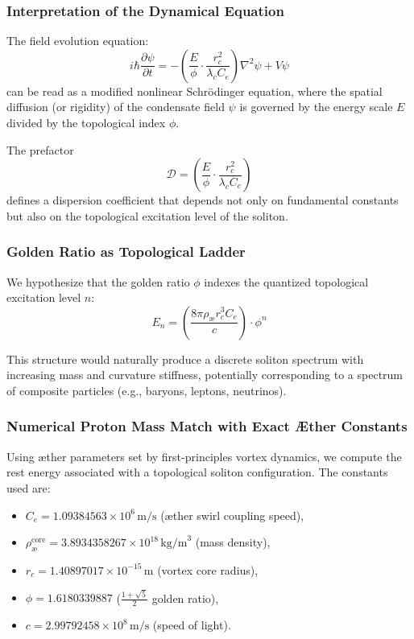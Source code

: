 \subsubsection{Interpretation of the Dynamical Equation}

The field evolution equation:
\begin{equation}
i\hbar \frac{\partial \psi}{\partial t}
= - \left( \frac{E}{\phi} \cdot \frac{r_c^2}{\lambda_c C_e} \right) \nabla^2 \psi + V \psi
\end{equation}
can be read as a modified nonlinear Schrödinger equation, where the spatial diffusion (or rigidity) of the condensate field $\psi$ is governed by the energy scale $E$ divided by the topological index $\phi$.

The prefactor
\[
\mathcal{D} = \left( \frac{E}{\phi} \cdot \frac{r_c^2}{\lambda_c C_e} \right)
\]
defines a dispersion coefficient that depends not only on fundamental constants but also on the topological excitation level of the soliton.

\subsubsection{Golden Ratio as Topological Ladder}

We hypothesize that the golden ratio $\phi$ indexes the quantized topological excitation level $n$:
\begin{equation}
E_n = \left( \frac{8\pi \rho_{\text{æ}} r_c^3 C_e}{c} \right) \cdot \phi^n
\end{equation}

This structure would naturally produce a discrete soliton spectrum with increasing mass and curvature stiffness, potentially corresponding to a spectrum of composite particles (e.g., baryons, leptons, neutrinos).

\subsubsection{Numerical Proton Mass Match with Exact Æther Constants}

Using æther parameters set by first-principles vortex dynamics, we compute the rest energy associated with a topological soliton configuration. The constants used are:

\begin{itemize}
  \item $C_e = 1.09384563 \times 10^6 \, \text{m/s}$ (æther swirl coupling speed),
  \item $\rho_{\text{æ}}^{\text{core}} = 3.8934358267 \times 10^{18} \, \text{kg/m}^3$ (mass density),
  \item $r_c = 1.40897017 \times 10^{-15} \, \text{m}$ (vortex core radius),
  \item $\phi = 1.6180339887$  ($\frac{1 + \sqrt{5}}{2}$ golden ratio),
  \item $c = 2.99792458 \times 10^8 \, \text{m/s}$ (speed of light).
\end{itemize}

